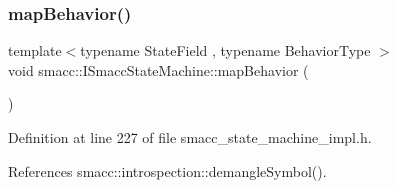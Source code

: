 \subsubsection{\texorpdfstring{map\+Behavior()}{mapBehavior()}}
{\footnotesize\ttfamily template$<$typename State\+Field , typename Behavior\+Type $>$ \\
void smacc\+::\+I\+Smacc\+State\+Machine\+::map\+Behavior (\begin{DoxyParamCaption}{ }\end{DoxyParamCaption})}



Definition at line 227 of file smacc\+\_\+state\+\_\+machine\+\_\+impl.\+h.



References smacc\+::introspection\+::demangle\+Symbol().



